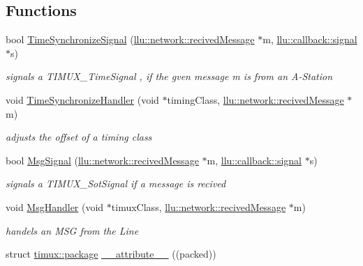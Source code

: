 \subsection*{Functions}
\begin{DoxyCompactItemize}
\item 
bool \hyperlink{namespacetimux_af9d865eb949c95b170ca458395332f06}{Time\+Synchronize\+Signal} (\hyperlink{structllu_1_1network_1_1recived_message}{llu\+::network\+::recived\+Message} $\ast$m, \hyperlink{namespacellu_1_1callback_a082ed24306809c4d250bd5ddfbae177f}{llu\+::callback\+::signal} $\ast$s)
\begin{DoxyCompactList}\small\item\em signals a T\+I\+M\+U\+X\+\_\+\+Time\+Signal , if the gven message m is from an A-\/\+Station \end{DoxyCompactList}\item 
void \hyperlink{namespacetimux_aaaa8c2d5485d4108b450aa5edf1e3aa3}{Time\+Synchronize\+Handler} (void $\ast$timing\+Class, \hyperlink{structllu_1_1network_1_1recived_message}{llu\+::network\+::recived\+Message} $\ast$m)
\begin{DoxyCompactList}\small\item\em adjusts the offset of a timing class \end{DoxyCompactList}\item 
bool \hyperlink{namespacetimux_ad0edf69fd830fa995ad603731acd5a20}{Msg\+Signal} (\hyperlink{structllu_1_1network_1_1recived_message}{llu\+::network\+::recived\+Message} $\ast$m, \hyperlink{namespacellu_1_1callback_a082ed24306809c4d250bd5ddfbae177f}{llu\+::callback\+::signal} $\ast$s)
\begin{DoxyCompactList}\small\item\em signals a T\+I\+M\+U\+X\+\_\+\+Sot\+Signal if a message is recived \end{DoxyCompactList}\item 
void \hyperlink{namespacetimux_a0325847c7fd72e51034fc14c8547d505}{Msg\+Handler} (void $\ast$timux\+Class, \hyperlink{structllu_1_1network_1_1recived_message}{llu\+::network\+::recived\+Message} $\ast$m)
\begin{DoxyCompactList}\small\item\em handels an M\+S\+G from the Line \end{DoxyCompactList}\item 
struct \hyperlink{structtimux_1_1package}{timux\+::package} \hyperlink{namespacetimux_a31970845e61d49b6ee9f97328d9aebcc}{\+\_\+\+\_\+attribute\+\_\+\+\_\+} ((packed))
\end{DoxyCompactItemize}
